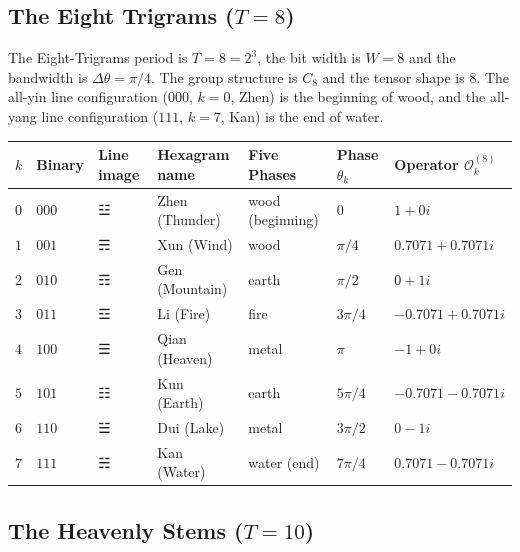 \subsection{\texorpdfstring{The Eight Trigrams ($T=8$)}{The Eight Trigrams (T=8)}}

\begin{definition}\label{def:bagua_operators}
The Eight-Trigrams period is $T=8=2^3$, the bit width is $W=8$ and the bandwidth is $\Delta\theta=\pi/4$. The group structure is $C_8$ and the tensor shape is $8$. The all-yin line configuration ($000$, $k=0$, Zhen) is the beginning of wood, and the all-yang line configuration ($111$, $k=7$, Kan) is the end of water.
\end{definition}

\begin{center}
\begin{tabular}{>{\centering\arraybackslash}p{0.6cm}>{\centering\arraybackslash}p{1.4cm}>{\centering\arraybackslash}p{1.4cm}>{\centering\arraybackslash}p{2cm}>{\centering\arraybackslash}p{2.1cm}>{\centering\arraybackslash}p{1.7cm}>{\raggedright\arraybackslash}p{2.8cm}}
\toprule
$k$ & Binary & Line image & Hexagram name & Five Phases & Phase $\theta_k$ & Operator $\mathcal{O}_k^{(8)}$ \\
\midrule
$0$ & $000$ & ☳ & Zhen (Thunder) & wood (beginning) & $0$ & $1+0i$ \\
$1$ & $001$ & ☴ & Xun (Wind) & wood & $\pi/4$ & $0.7071+0.7071i$ \\
$2$ & $010$ & ☶ & Gen (Mountain) & earth & $\pi/2$ & $0+1i$ \\
$3$ & $011$ & ☲ & Li (Fire) & fire & $3\pi/4$ & $-0.7071+0.7071i$ \\
$4$ & $100$ & ☰ & Qian (Heaven) & metal & $\pi$ & $-1+0i$ \\
$5$ & $101$ & ☷ & Kun (Earth) & earth & $5\pi/4$ & $-0.7071-0.7071i$ \\
$6$ & $110$ & ☱ & Dui (Lake) & metal & $3\pi/2$ & $0-1i$ \\
$7$ & $111$ & ☵ & Kan (Water) & water (end) & $7\pi/4$ & $0.7071-0.7071i$ \\
\bottomrule
\end{tabular}
\end{center}

\subsection{\texorpdfstring{The Heavenly Stems ($T=10$)}{The Heavenly Stems (T=10)}}

